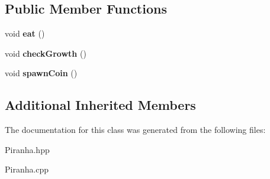 \subsection*{Public Member Functions}
\begin{DoxyCompactItemize}
\item 
\mbox{\label{classPiranha_ac48c0256edd56c427b3d82f6e0d4df82}} 
void {\bfseries eat} ()
\item 
\mbox{\label{classPiranha_ad35beb897ca7281e3792faf8211e39a3}} 
void {\bfseries check\+Growth} ()
\item 
\mbox{\label{classPiranha_ad17da28a5556a91170fb6bfe4e331b82}} 
void {\bfseries spawn\+Coin} ()
\end{DoxyCompactItemize}
\subsection*{Additional Inherited Members}


The documentation for this class was generated from the following files\+:\begin{DoxyCompactItemize}
\item 
Piranha.\+hpp\item 
Piranha.\+cpp\end{DoxyCompactItemize}
